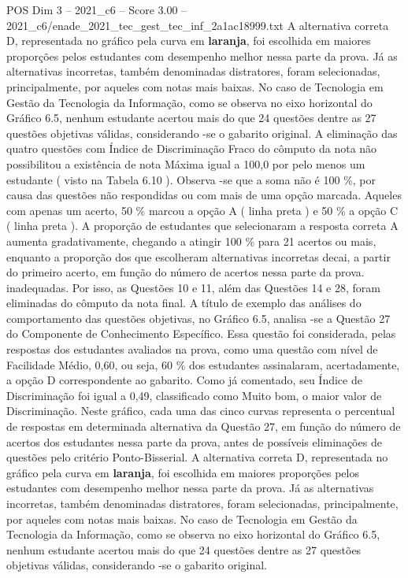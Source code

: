 \begin{textsample}{POS Dim 3 – 2021\_c6 – Score 3.00 – 2021\_c6/enade\_2021\_tec\_gest\_tec\_inf\_2a1ac18999.txt}
A alternativa correta D, representada no gráfico pela curva em \textbf{laranja}, foi escolhida em maiores proporções pelos estudantes com desempenho melhor nessa parte da prova.
Já as alternativas incorretas, também denominadas distratores, foram selecionadas, principalmente, por aqueles com notas mais baixas.
No caso de Tecnologia em Gestão da Tecnologia da Informação, como se observa no eixo horizontal do Gráfico 6.5, nenhum estudante acertou mais do que 24 questões dentre as 27 questões objetivas válidas, considerando -se o gabarito original.
A eliminação das quatro questões com Índice de Discriminação Fraco do cômputo da nota não possibilitou a existência de nota Máxima igual a 100,0 por pelo menos um estudante ( visto na Tabela 6.10 ).
Observa -se que a soma não é 100 \%, por causa das questões não respondidas ou com mais de uma opção marcada.
Aqueles com apenas um acerto, 50 \% marcou a opção A ( linha preta ) e 50 \% a opção C ( linha preta ).
A proporção de estudantes que selecionaram a resposta correta A aumenta gradativamente, chegando a atingir 100 \% para 21 acertos ou mais, enquanto a proporção dos que escolheram alternativas incorretas decai, a partir do primeiro acerto, em função do número de acertos nessa parte da prova. inadequadas.
Por isso, as Questões 10 e 11, além das Questões 14 e 28, foram eliminadas do cômputo da nota final.
A título de exemplo das análises do comportamento das questões objetivas, no Gráfico 6.5, analisa -se a Questão 27 do Componente de Conhecimento Específico.
Essa questão foi considerada, pelas respostas dos estudantes avaliados na prova, como uma questão com nível de Facilidade Médio, 0,60, ou seja, 60 \% dos estudantes assinalaram, acertadamente, a opção D correspondente ao gabarito.
Como já comentado, seu Índice de Discriminação foi igual a 0,49, classificado como Muito bom, o maior valor de Discriminação.
Neste gráfico, cada uma das cinco curvas representa o percentual de respostas em determinada alternativa da Questão 27, em função do número de acertos dos estudantes nessa parte da prova, antes de possíveis eliminações de questões pelo critério Ponto-Bisserial.
A alternativa correta D, representada no gráfico pela curva em \textbf{laranja}, foi escolhida em maiores proporções pelos estudantes com desempenho melhor nessa parte da prova.
Já as alternativas incorretas, também denominadas distratores, foram selecionadas, principalmente, por aqueles com notas mais baixas.
No caso de Tecnologia em Gestão da Tecnologia da Informação, como se observa no eixo horizontal do Gráfico 6.5, nenhum estudante acertou mais do que 24 questões dentre as 27 questões objetivas válidas, considerando -se o gabarito original.

\end{textsample}
